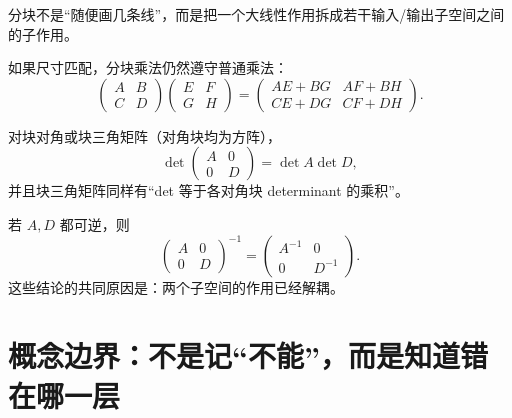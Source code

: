 \documentclass[11pt,a4paper]{ctexart}
\begin{document}
分块不是“随便画几条线”，而是把一个大线性作用拆成若干输入/输出子空间之间的子作用。

如果尺寸匹配，分块乘法仍然遵守普通乘法：
\[
\begin{pmatrix}A&B\\C&D\end{pmatrix}
\begin{pmatrix}E&F\\G&H\end{pmatrix}
=
\begin{pmatrix}
AE+BG&AF+BH\\
CE+DG&CF+DH
\end{pmatrix}.
\]

对块对角或块三角矩阵（对角块均为方阵），
\[
\det\begin{pmatrix}A&0\\0&D\end{pmatrix}=\det A\det D,
\]
并且块三角矩阵同样有“det 等于各对角块 determinant 的乘积”。

若 $A,D$ 都可逆，则
\[
\begin{pmatrix}A&0\\0&D\end{pmatrix}^{-1}
=
\begin{pmatrix}A^{-1}&0\\0&D^{-1}\end{pmatrix}.
\]
这些结论的共同原因是：两个子空间的作用已经解耦。

\section{概念边界：不是记“不能”，而是知道错在哪一层}
\end{document}
